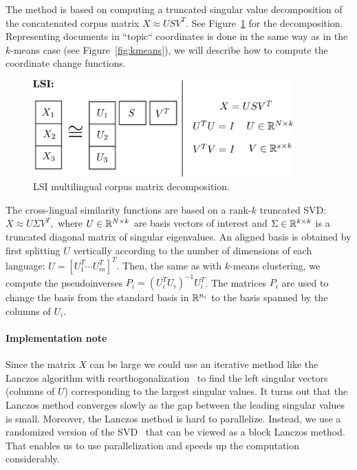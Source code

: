  The method is based on computing a truncated singular value decomposition of the concatenated corpus matrix $X \approx U S V^T$. See Figure~\ref{fig:lsi} for the decomposition. Representing documents in ``topic`` coordinates is done in the same way as in the $k$-means case (see Figure~\ref{fig:kmeans}), we will describe how to compute the coordinate change functions.

\begin{figure}[tbp]
\centering
\includegraphics[width=10cm]{figures/lsi.pdf}
\caption{\label{fig:lsi} LSI multilingual corpus matrix decomposition.}
\end{figure}

The cross-lingual similarity functions are based on a rank-$k$ truncated SVD: $X \approx U \Sigma V^T,$ where $U \in \mathbb{R}^{N \times k}$ are basis vectors of interest and $\Sigma \in \mathbb{R}^{k \times k}$ is a truncated diagonal matrix of singular eigenvalues. An aligned basis is obtained by first splitting $U$ vertically according to the number of dimensions of each language: $U = [U_1^T \cdots U_m^T]^T$. Then, the same as with $k$-means clustering, we compute the pseudoinverses $P_i = (U_i^T U_i)^{-1} U_i^T$. The matrices $P_i$ are used to change the basis from the standard basis in $\mathbb{R}^{n_i}$ to the basis spanned by the columns of $U_i$.

\paragraph{Implementation note}

  Since the matrix $X$ can be large we could use an iterative method like the Lanczos algorithm with reorthogonalization~\cite{golub} to find the left singular vectors (columns of $U$) corresponding to the largest singular values. It turns out that the Lanczos method converges slowly as the gap between the leading singular values is small. Moreover, the Lanczos method is hard to parallelize. Instead, we use a randomized version of the SVD~\cite{tropp} that can be viewed as a block Lanczos method. That enables us to use parallelization and speeds up the computation considerably.

